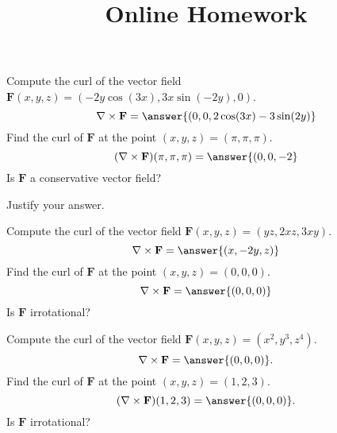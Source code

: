 \documentclass{ximera}
\title{Online Homework}
\begin{document}
\begin{abstract}
\end{abstract}
\maketitle

\begin{problem}
Compute the curl of the vector field $\mathbf{F}(x,y,z) = (-2y\cos(3x),3x\sin(-2y),0)$.
\[
\nabla\times \mathbf{F} = \answer{(0,0,2\cos(3x)-3\sin(2y)}
\]
Find the curl of $\mathbf{F}$ at the point $(x,y,z) = (\pi,\pi,\pi)$.
\[
(\nabla\times \mathbf{F})(\pi,\pi,\pi) = \answer{(0,0,-2}
\]
Is $\mathbf{F}$ a conservative vector field?
\begin{multipleChoice}
\end{multipleChoice}
Justify your answer.
\begin{freeResponse}
\end{freeResponse}
\end{problem}

\begin{problem}
Compute the curl of the vector field $\mathbf{F}(x,y,z) = (yz, 2xz, 3xy)$.
\[
\nabla\times \mathbf{F} = \answer{(x, -2y, z)}
\]
Find the curl of $\mathbf{F}$ at the point $(x,y,z) = (0,0,0)$.
\[
\nabla\times \mathbf{F} = \answer{(0, 0, 0)}
\]
Is $\mathbf{F}$ irrotational?
\begin{multipleChoice}
\end{multipleChoice}
\end{problem}

\begin{problem}
Compute the curl of the vector field $\mathbf{F}(x,y,z) = (x^2, y^3, z^4)$.
\[
\nabla\times \mathbf{F} = \answer{(0,0,0)}.
\]
Find the curl of $\mathbf{F}$ at the point $(x,y,z) = (1,2,3)$.
\[
(\nabla\times \mathbf{F})(1,2,3) = \answer{(0,0,0)}.
\]
Is $\mathbf{F}$ irrotational?
\begin{multipleChoice}
\end{multipleChoice}
\end{problem}
\end{document}

